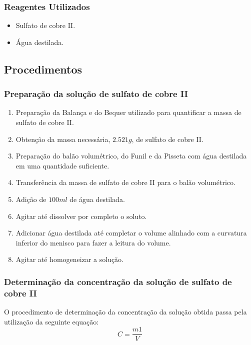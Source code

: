 \documentclass[a4paper, 11pt]{article}
\begin{document}
    \subsubsection{Reagentes Utilizados}\label{sec:reagentes_utilizados}
    \begin{itemize}
        \item Sulfato de cobre II\@.
        \item Água destilada\@.
    \end{itemize}
    \doublespacing

    \subsection{Procedimentos}\label{sec:procedimentos}
    \subsubsection{Preparação da solução de sulfato de cobre II}\label{sec:preparacao_solucao}
    \begin{enumerate}
        \item Preparação da Balança e do Bequer utilizado para quantificar a massa de sulfato de cobre II\@.
        \item Obtenção da massa necessária, $2.521g$, de sulfato de cobre II\@.
        \item Preparação do balão volumétrico, do Funil e da Pisseta com água destilada em uma quantidade suficiente\@.
        \item Transferência da massa de sulfato de cobre II para o balão volumétrico\@.
        \item Adição de $100ml$ de água destilada\@.
        \item Agitar até dissolver por completo o soluto\@.
        \item Adicionar água destilada até completar o volume alinhado com a curvatura inferior do menisco para fazer a leitura do volume\@.
        \item Agitar até homogeneizar a solução\@.
    \end{enumerate}
    \doublespacing

    \subsubsection{Determinação da concentração da solução de sulfato de cobre II}\label{sec:determinacao_concentracao}
    \indent O procedimento de determinação da concentração da solução obtida passa pela utilização da seguinte equação:\\
    \begin{equation}
        \label{eq:equacao_concentracao}
        C = \frac{m1}{V}
    \end{equation}
\end{document}
